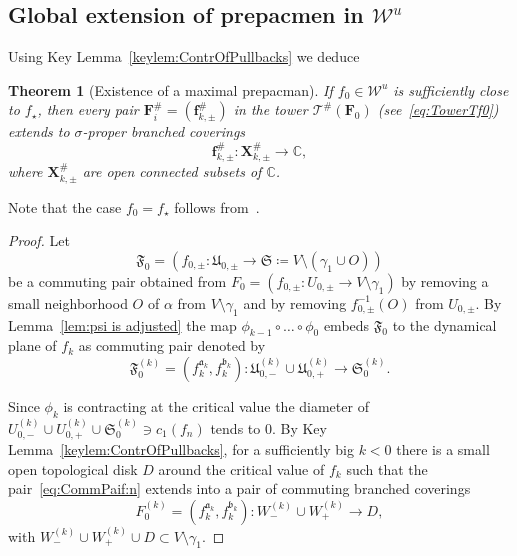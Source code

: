 \documentclass[]{amsart}
\newcommand\TT{\mathcal{T}}
\newcommand{\bF}{{\mathbf F}}
\newcommand{\bX}{{\mathbf X}}
\newcommand{\bbf}{{\mathbf f}}
\newcommand{\str}{{\star}}
\renewcommand{\aa}{{\mathfrak{a}}}
\newcommand{\bb}{{\mathfrak{b}}}
\newcommand\WW{\mathcal{W}}
\newcommand{\C}{\mathbb{C}}
\newtheorem{thm}{Theorem}[section]
\theoremstyle{remark}
\numberwithin{equation}{section}
\theoremstyle{definition}
\begin{document}
\subsection{Global extension of prepacmen in $\WW^u$}
Using Key Lemma~\ref{keylem:ContrOfPullbacks} we deduce
\begin{thm}[Existence of a maximal prepacman]
\label{thm:MaxCommPair:long} 
If $f_0\in \WW^u$  is sufficiently close to $f_\str$, then every pair $\bF_i^{\#}=\left( \bbf^{\#}_{k,\pm}\right)$ in the tower $\TT^{\#}(\bF_0)$ (see~\eqref{eq:TowerTf0}) extends to $\sigma$-proper branched coverings
\[\bbf^{\#}_{k,\pm}\colon \bX^{\#}_{k,\pm}\to \C,\] 
where $\bX^{\#}_{k,\pm}$ are open connected subsets of $\C$.
\end{thm}
\noindent Note that the case $f_0=f_\str$ follows from~\cite[Theorem 8.1]{McM3}.
\begin{proof}Let 
\[\mathfrak F_0 =\left(f_{0, \pm } \colon \mathfrak U_{0,\pm} \to \mathfrak S \coloneqq V\setminus (\gamma_1\cup O)\right)\] 
be a commuting pair obtained from $F_{0} = \left(f_{0, \pm } \colon U_{0,\pm}\to V\setminus \gamma_1\right)$ by removing a small neighborhood $O$ of $\alpha$ from $ V\setminus \gamma_1$ and by removing $f_{0,\pm}^{-1}(O)$ from $  U_{0,\pm}$. By Lemma~\ref{lem:psi is adjusted} the map
$\phi_{k-1}\circ   \dots\circ \phi_{0}$ embeds $\mathfrak F_0$ to the dynamical plane of $f_k$ as commuting pair denoted by
\begin{equation}
\label{eq:CommPaif:n}
\mathfrak F^{(k)}_0 =\left( f_k^{\aa_k},f^{\bb_k}_k \right)\colon \mathfrak U^{(k)}_{0,-} \cup \mathfrak U^{(k)}_{0,+} \to  \mathfrak S_0^{(k)}.
\end{equation}


Since $\phi_{k}$ is contracting at the critical value the diameter of $U^{(k)}_{0,-} \cup U^{(k)}_{0,+}\cup  \mathfrak S^{(k)}_{0}\ni c_1(f_n)$ tends to $0$. By Key Lemma~\ref{keylem:ContrOfPullbacks}, for a sufficiently big $k<0$
there is a small open topological disk $D$ around the critical value of $f_k$ such that  the pair~\eqref{eq:CommPaif:n} extends into a pair of commuting branched coverings
\begin{equation}
\label{eq:CommPaif:n:ext}
F^{(k)}_0 =\left( f_{k}^{\aa_k},f^{\bb_k}_{k} \right)\colon  W_{-}^{(k)} \cup   W^{(k)}_{+} \to D,
\end{equation} with $W_{-}^{(k)} \cup   W^{(k)}_{+} \cup D\subset V\setminus \gamma_1$.




\end{proof}
\end{document}
